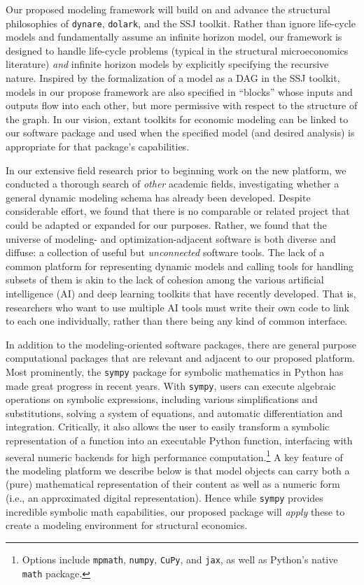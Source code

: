 \documentclass[12pt,pdftex,letterpaper]{article}
\begin{document}
Our proposed modeling framework will build on and advance the structural philosophies of \texttt{dynare}, \texttt{dolark}, and the SSJ toolkit. Rather than ignore life-cycle models and fundamentally assume an infinite horizon model, our framework is  designed to handle life-cycle problems (typical in the structural microeconomics literature) \textit{and} infinite horizon models by explicitly specifying the recursive nature. Inspired by the formalization of a model as a DAG in the SSJ toolkit, models in our propose framework are also specified in ``blocks'' whose inputs and outputs flow into each other, but more permissive with respect to the structure of the graph. In our vision, extant toolkits for economic modeling can be linked to our software package and used when the specified model (and desired analysis) is appropriate for that package's capabilities.

In our extensive field research prior to beginning work on the new platform, we conducted a thorough search of \textit{other} academic fields, investigating whether a general dynamic modeling schema has already been developed. Despite considerable effort, we found that there is no comparable or related project that could be adapted or expanded for our purposes. Rather, we found that the universe of modeling- and optimization-adjacent software is both diverse and diffuse: a collection of useful but \textit{unconnected} software tools. The lack of a common platform for representing dynamic models and calling tools for handling subsets of them is akin to the lack of cohesion among the various artificial intelligence (AI) and deep learning toolkits that have recently developed. That is, researchers who want to use multiple AI tools must write their own code to link to each one individually, rather than there being any kind of common interface.

In addition to the modeling-oriented software packages, there are general purpose computational packages that are relevant and adjacent to our proposed platform. Most prominently, the \texttt{sympy} package for symbolic mathematics in Python has made great progress in recent years. With \texttt{sympy}, users can execute algebraic operations on symbolic expressions, including various simplifications and substitutions, solving a system of equations, and automatic differentiation and integration. Critically, it also allows the user to easily transform a symbolic representation of a function into an executable Python function, interfacing with several numeric backends for high performance computation.\footnote{Options include \texttt{mpmath}, \texttt{numpy}, \texttt{CuPy}, and \texttt{jax}, as well as Python's native \texttt{math} package.} A key feature of the modeling platform we describe below is that model objects can carry both a (pure) mathematical representation of their content as well as a numeric form (i.e., an approximated digital representation). Hence while \texttt{sympy} provides incredible symbolic math capabilities, our proposed package will \textit{apply} these to create a modeling environment for structural economics.
\end{document}
